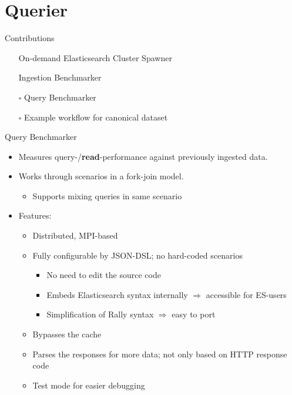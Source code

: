 \documentclass[compress,aspectratio=169]{beamer}
\newcommand{\ccheckmark}{\mbox{\ooalign{$\checkmark$\cr\hidewidth$\square$\hidewidth\cr}}}
\newcommand{\ccheckbox}{\mbox{$\square$}}
\begin{document}
	\section{Querier}
  \begin{frame}{Contributions}
    \begin{center}
      \begin{itemize}
        \item[\ccheckmark] On-demand Elasticsearch Cluster Spawner
        \item[\ccheckmark] Ingestion Benchmarker
        \item[\ccheckbox] Query Benchmarker
        \item[\ccheckbox] Example workflow for canonical dataset
      \end{itemize}
    \end{center}
  \end{frame}

	\begin{frame}{Query Benchmarker}
		\begin{itemize}
      \item Measures query-/\textbf{read}-performance against previously ingested data.
        \pause
      \item Works through scenarios in a fork-join model.
        \begin{itemize}
          \item Supports mixing queries in same scenario
        \end{itemize}
        \pause
      \item Features:
        \begin{itemize}
          \item Distributed, MPI-based
            \pause
          \item Fully configurable by JSON-DSL; no hard-coded scenarios
            \begin{itemize}
              \item No need to edit the source code
              \item Embeds Elasticsearch syntax internally $\Rightarrow$ accessible for ES-users
              \item Simplification of Rally syntax $\Rightarrow$ easy to port
            \end{itemize}
            \pause
          \item Bypasses the cache
            \pause
          \item Parses the responses for more data; not only based on HTTP response code
            \pause
          \item Test mode for easier debugging
        \end{itemize}
		\end{itemize}
	\end{frame}
\end{document}
